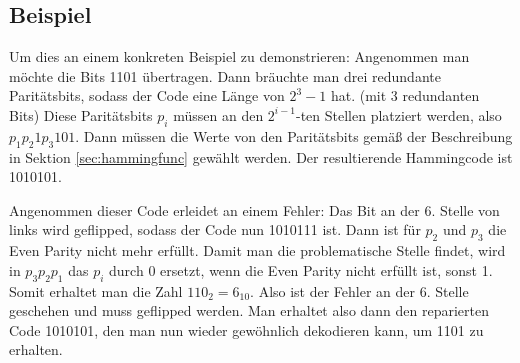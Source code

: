 \subsection{Beispiel}
Um dies an einem konkreten Beispiel zu demonstrieren: Angenommen man möchte die Bits 1101 übertragen. Dann bräuchte man drei redundante Paritätsbits,
sodass der Code eine Länge von $2^3 - 1$ hat. (mit 3 redundanten Bits) Diese Paritätsbits $p_i$ müssen an den $2^{i - 1}$-ten Stellen platziert werden, also
$p_1 p_2 1 p_3 101$. Dann müssen die Werte von den Paritätsbits gemäß der Beschreibung in Sektion \ref{sec:hammingfunc} gewählt werden.
Der resultierende Hammingcode ist 1010101.

Angenommen dieser Code erleidet an einem Fehler: Das Bit an der 6. Stelle von links wird geflipped, sodass der Code nun
1010111 ist. Dann ist für $p_2$ und $p_3$ die Even Parity nicht mehr erfüllt. Damit man die problematische Stelle findet,
wird in $p_3 p_2 p_1$ das $p_i$ durch 0 ersetzt, wenn die Even Parity nicht erfüllt ist, sonst 1. Somit erhaltet man die Zahl $110_2 = 6_{10}$.
Also ist der Fehler an der 6. Stelle geschehen und muss geflipped werden. Man erhaltet also dann den reparierten Code 1010101,
den man nun wieder gewöhnlich dekodieren kann, um 1101 zu erhalten.

